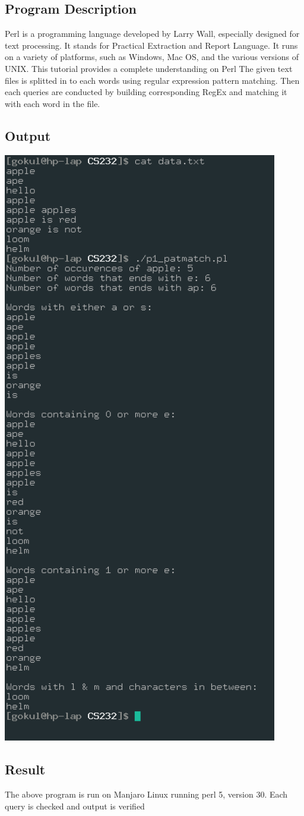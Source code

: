 \documentclass{article}
\begin{document}
\subsection{Program Description}
Perl is a programming language developed by Larry Wall, especially designed
for text processing. It stands for Practical Extraction and Report Language.
It runs on a variety of platforms, such as Windows, Mac OS, and the 
various versions of UNIX. This tutorial provides a complete understanding
on Perl\newline
The given text files is splitted in to each words using regular expression
pattern matching. Then each queries are conducted by building corresponding
RegEx and matching it with each word in the file.

\subsection{Output}
\includegraphics[width=0.9\textwidth]{img/p19.png}\newline

\subsection{Result}
The above program is run on Manjaro Linux running perl 5, version 30. 
Each query is checked and output is verified
\end{document}
